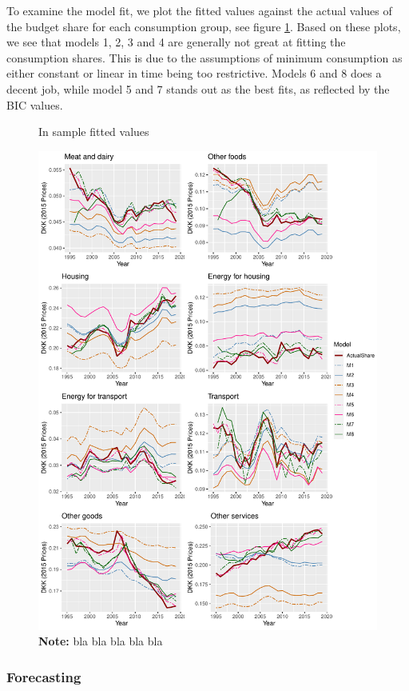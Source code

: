 To examine the model fit, we plot the fitted values against the actual values of the budget share for each consumption group, see figure \ref{modelfit}. Based on these plots, we see that models 1, 2, 3 and 4 are generally not great at fitting the consumption shares. This is due to the assumptions of minimum consumption as either constant or linear in time being too restrictive. Models 6 and 8 does a decent job, while model 5 and 7 stands out as the best fits, as reflected by the BIC values.
\begin{figure}[H]
\centering
\caption{In sample fitted values}
\label{modelfit}
\includegraphics[width=.9\textwidth]{Figures/w_predict_heleperioden.pdf}
\captionsetup{singlelinecheck=off,size=scriptsize}
\setlength{\captionmargin}{10pt}
\caption*{
\textbf{Note:} bla bla bla bla bla}
\end{figure}

\subsubsection{Forecasting}

